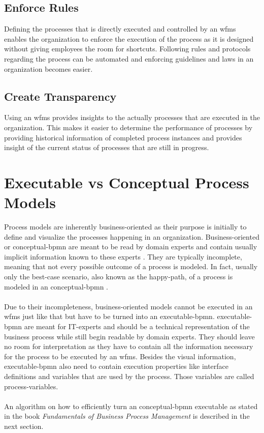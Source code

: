 \subsection{Enforce Rules}
Defining the processes that is directly executed and controlled by an \gls{wfms} enables the organization to enforce the execution of the process as it is designed without giving employees the room for shortcuts. Following rules and protocols regarding the process can be automated and enforcing guidelines and laws in an organization becomes easier. \cite{fundamentals}

\subsection{Create Transparency}
Using an \gls{wfms} provides insights to the actually processes that are executed in the organization. This makes it easier to determine the performance of processes by providing historical information of completed process instances and provides insight of the current status of processes that are still in progress. \cite{gadatsch2020grundkurs}

\section{Executable vs Conceptual Process Models}
Process models are inherently business-oriented as their purpose is initially to define and visualize the processes happening in an organization. Business-oriented or \gls{conceptual-bpmn} are meant to be read by domain experts and contain usually implicit information known to these experts \cite{fundamentals}. They are typically incomplete, meaning that not every possible outcome of a process is modeled. In fact, usually only the best-case scenario, also known as the \gls{happy-path}, of a process is modeled in an \gls{conceptual-bpmn} \cite{freund2019real}.\\~\\Due to their incompleteness, business-oriented models cannot be executed in an \gls{wfms} just like that but have to be turned into an \gls{executable-bpmn}. \gls{executable-bpmn} are meant for IT-experts and should be a technical representation of the business process while still begin readable by domain experts. They should leave no room for interpretation as they have to contain all the information necessary for the process to be executed by an \gls{wfms}. Besides the visual information, \gls{executable-bpmn} also need to contain execution properties like interface definitions and variables that are used by the process. Those variables are called \gls{process-variables}.\cite{fundamentals} \\~\\An algorithm on how to efficiently turn an \gls{conceptual-bpmn} executable as stated in the book \textit{Fundamentals of Business Process Management} \cite{fundamentals} is described in the next section. 

